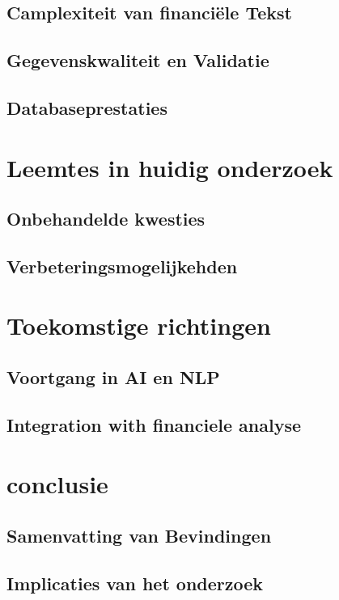 \subsection{Camplexiteit van financiële Tekst}
\subsection{Gegevenskwaliteit en Validatie}
\subsection{Databaseprestaties}
\section{Leemtes in huidig onderzoek}
\subsection{Onbehandelde kwesties}
\subsection{Verbeteringsmogelijkehden}
\section{Toekomstige richtingen}
\subsection{Voortgang in AI en NLP}
\subsection{Integration with financiele analyse}
\section{conclusie}
\subsection{Samenvatting van Bevindingen}
\subsection{Implicaties van het onderzoek}